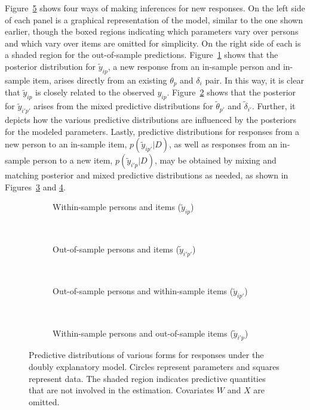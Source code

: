 \documentclass[12pt, letterpaper]{article}
\begin{document}
Figure~\ref{fig:ppmc-models} shows four ways of making inferences for new responses. On the left side of each panel is a graphical representation of the model, similar to the one shown earlier, though the boxed regions indicating which parameters vary over persons and which vary over items are omitted for simplicity.
On the right side of each is a shaded region for the out-of-sample predictions.
Figure~\ref{subfig:ppmc-same-both} shows that the posterior distribution for $\tilde y_{ip}$, a new response from an in-sample person and in-sample item, arises directly from an existing $\theta_p$ and $\delta_i$ pair. In this way, it is clear that $\tilde y_{ip}$ is closely related to the observed $y_{ip}$.
Figure~\ref{subfig:ppmc-new-both} shows that the posterior for $\tilde y_{i'p'}$ arises from the mixed predictive distributions for $\tilde \theta_{p'}$ and $\tilde \delta_{i'}$. Further, it depicts how the various predictive distributions are influenced by the posteriors for the modeled parameters.
Lastly, predictive distributions for responses from a new person to an in-sample item, $p(\tilde y_{ip'} | D)$, as well as responses from an in-sample person to a new item, $p(\tilde y_{i'p} | D)$, may be obtained by mixing and matching posterior and mixed predictive distributions as needed, as shown in Figures~\ref{subfig:ppmc-new-persons} and \ref{subfig:ppmc-new-items}.

\begin{figure}[btp]
	\centering
	\begin{subfigure}[b]{.4\textwidth}
		
		\caption{Within-sample persons and items ($\tilde y_{ip}$)}
		\label{subfig:ppmc-same-both}
	\end{subfigure}
	~
	\begin{subfigure}[b]{.4\textwidth}
		
		\caption{Out-of-sample persons and items ($\tilde y_{i'p'}$)}
		\label{subfig:ppmc-new-both}
	\end{subfigure}
	~
	\begin{subfigure}[b]{.4\textwidth}
		
		\caption{Out-of-sample persons and within-sample items ($\tilde y_{ip'}$)}
		\label{subfig:ppmc-new-persons}
	\end{subfigure}
	~
	\begin{subfigure}[b]{.4\textwidth}
		
		\caption{Within-sample persons and out-of-sample items ($\tilde y_{i'p}$)}
		\label{subfig:ppmc-new-items}
	\end{subfigure}
	\caption[Predictive distributions of various forms for responses under the doubly explanatory model]
	{Predictive distributions of various forms for responses under the doubly explanatory model. Circles represent parameters and squares represent data. The shaded region indicates predictive quantities that are not involved in the estimation. Covariates $W$ and $X$ are omitted.}
	\label{fig:ppmc-models}
\end{figure}
\end{document}
